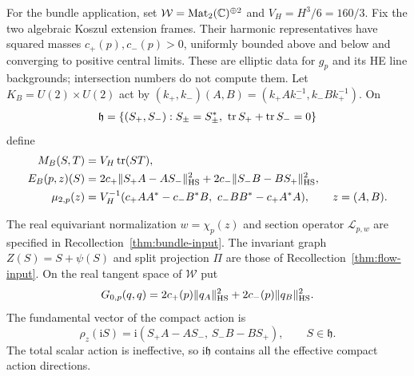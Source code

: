 For the bundle application, set
$\mathcal W=\operatorname{Mat}_2(\mathbb C)^{\oplus2}$ and
$V_H=H^3/6=160/3$.
Fix the two algebraic Koszul extension frames. Their harmonic
representatives have squared masses $c_+(p),c_-(p)>0$,
uniformly bounded above and below and converging to positive
central limits. These are elliptic data for $g_p$ and its HE
line backgrounds; intersection numbers do not compute them.
Let $K_B=U(2)\times U(2)$ act by
$(k_+,k_-)(A,B)=(k_+Ak_-^{-1},k_-Bk_+^{-1})$.
On
\[
 \mathfrak h=\{(S_+,S_-):S_\pm=S_\pm^*,\
                              \operatorname{tr} S_++\operatorname{tr} S_-=0\}
\]
define
\begin{equation}\label{eq:bundle-model}
 \begin{split}
 M_B(S,T)&=V_H\operatorname{tr}(ST),\\
 E_B(p,z)(S)&=2c_+\|S_+A-AS_-\|_{\rm HS}^2
                    +2c_-\|S_-B-BS_+\|_{\rm HS}^2,\\
 \mu_{2,p}(z)&=V_H^{-1}
 (c_+AA^*-c_-B^*B,\ c_-BB^*-c_+A^*A),\qquad z=(A,B).
 \end{split}
\end{equation}

The real equivariant normalization $w=\chi_p(z)$ and
section operator $\mathcal L_{p,w}$ are specified in
Recollection~\ref{thm:bundle-input}. The invariant graph
$Z(S)=S+\psi(S)$ and split projection $\Pi$ are those of
Recollection~\ref{thm:flow-input}.
On the real tangent space of $\mathcal W$ put
\begin{equation}\label{eq:arrow-mass}
 G_{0,p}(q,q)=2c_+(p)\|q_A\|_{\rm HS}^2+
                              2c_-(p)\|q_B\|_{\rm HS}^2.
\end{equation}
The fundamental vector of the compact action is
\begin{equation}\label{eq:fundamental-action}
 \rho_z(\mathrm iS)
   =\mathrm i(S_+A-AS_-,\,S_-B-BS_+),\qquad S\in\mathfrak h.
\end{equation}
The total scalar action is ineffective, so $\mathrm i\mathfrak h$
contains all the effective compact action directions.

